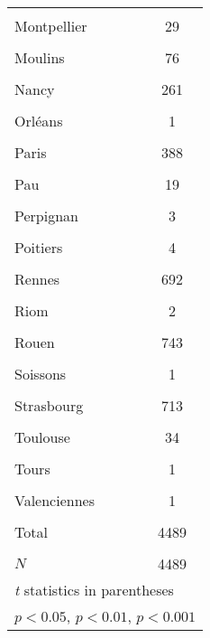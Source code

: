 {\begin{tabular}{l*{1}{c}}
            &                     \\
[1em]
Montpellier &          29         \\
            &                     \\
[1em]
Moulins     &          76         \\
            &                     \\
[1em]
Nancy       &         261         \\
            &                     \\
[1em]
Orléans     &           1         \\
            &                     \\
[1em]
Paris       &         388         \\
            &                     \\
[1em]
Pau         &          19         \\
            &                     \\
[1em]
Perpignan   &           3         \\
            &                     \\
[1em]
Poitiers    &           4         \\
            &                     \\
[1em]
Rennes      &         692         \\
            &                     \\
[1em]
Riom        &           2         \\
            &                     \\
[1em]
Rouen       &         743         \\
            &                     \\
[1em]
Soissons    &           1         \\
            &                     \\
[1em]
Strasbourg  &         713         \\
            &                     \\
[1em]
Toulouse    &          34         \\
            &                     \\
[1em]
Tours       &           1         \\
            &                     \\
[1em]
Valenciennes&           1         \\
            &                     \\
[1em]
Total       &        4489         \\
            &                     \\
\hline
\(N\)       &        4489         \\
\hline\hline
\multicolumn{2}{l}{\footnotesize \textit{t} statistics in parentheses}\\
\multicolumn{2}{l}{\footnotesize \sym{*} \(p<0.05\), \sym{**} \(p<0.01\), \sym{***} \(p<0.001\)}\\
\end{tabular}
}
